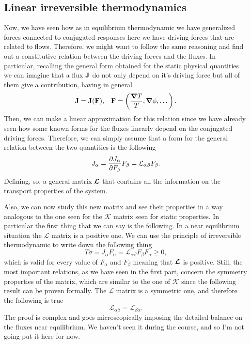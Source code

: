\subsection{Linear irreversible thermodynamics}

Now, we have seen how as in equilibrium thermodynamic we have generalized forces connected to conjugated responses here we have driving forces that are related to flows. Therefore, we might want to follow the same reasoning and find out a constitutive relation between the driving forces and the fluxes. In particular, recalling the general form obtained for the static physical quantities we can imagine that a flux $\vb{J}$ do not only depend on it's driving force but all of them give a contribution, having in general
\begin{align}
    &\vb{J} = \vb{J}(\vb{F}), &\vb{F} = \left(\frac{\grad T}{T}, \grad \phi, \dots\right).
\end{align}
Then, we can make a linear approximation for this relation since we have already seen how some known forms for the fluxes linearly depend on the conjugated driving forces. Therefore, we can simply assume that a form for the general relation between the two quantities is the following
\begin{equation}
    J_\alpha = \pdv{J_\alpha}{F_\beta}F_\beta = \mathcal{L}_{\alpha\beta}F_\beta.
\end{equation}
Defining, so, a general matrix $\vb*{\mathcal{L}}$ that contains all the information on the transport properties of the system.

Also, we can now study this new matrix and see their properties in a way analogous to the one seen for the $\mathcal{K}$ matrix seen for static properties. In particular the first thing that we can say is the following.
{
    In a near equilibrium situation the $\mathcal{L}$ matrix is a positive one.
}
{
    We can use the principle of irreversible thermodynamic to write down the following thing
    \begin{equation}
        T\dot{\sigma} = J_\alpha F_\alpha = \mathcal{L}_{\alpha\beta}F_\beta F_\alpha \ge 0,
    \end{equation}
    which is valid for every value of $F_\alpha$ and $F_\beta$ meaning that $\vb*{\mathcal{L}}$ is positive.
}
\noindent
Still, the most important relations, as we have seen in the first part, concern the symmetry properties of the matrix, which are similar to the one of $\mathcal{K}$ since the following result can be proven formally.
{
    The $\mathcal{L}$ matrix is a symmetric one, and therefore the following is true
    \begin{equation}
        \mathcal{L}_{\alpha\beta} = \mathcal{L}_{\beta\alpha}.
    \end{equation}
}
{
    The proof is complex and goes microscopically imposing the detailed balance on the fluxes near equilibrium. We haven't seen it during the course, and so I'm not going put it here for now.
}

